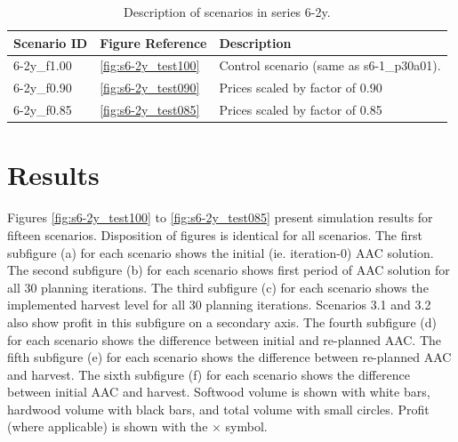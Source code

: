 \begin{table}
  \centering
  \begin{tabular}{lll}
    \hline
    Scenario ID & Figure Reference & Description \\
    \hline
    6-2y\_f1.00 & \ref{fig:s6-2y_test100} & Control scenario (same as s6-1\_p30a01). \\
    6-2y\_f0.90 & \ref{fig:s6-2y_test090} & Prices scaled by factor of 0.90 \\
    6-2y\_f0.85 & \ref{fig:s6-2y_test085} & Prices scaled by factor of 0.85 \\
    \hline
  \end{tabular}
  \caption{Description of scenarios in series 6-2y.}
  \label{tab:scenario_list}
\end{table}


\section{Results}

Figures \ref{fig:s6-2y_test100} to \ref{fig:s6-2y_test085} present
simulation results for fifteen scenarios. %
Disposition of figures is identical for all scenarios. The
first subfigure (a) for each scenario shows the initial
(ie. iteration-0) AAC solution. The second subfigure (b) for each
scenario shows first period of AAC solution for all 30 planning
iterations. The third subfigure (c) for each scenario shows the
implemented harvest level for all 30 planning iterations. Scenarios
3.1 and 3.2 also show profit in this subfigure on a secondary
axis. The fourth subfigure (d) for each scenario shows the difference
between initial and re-planned AAC. The fifth subfigure (e) for each
scenario shows the difference between re-planned AAC and harvest.  The
sixth subfigure (f) for each scenario shows the difference between
initial AAC and harvest. Softwood volume is shown with white bars,
hardwood volume with black bars, and total volume with small
circles. Profit (where applicable) is shown with the $\times$
symbol. 

